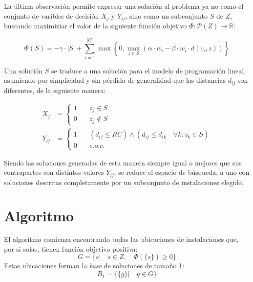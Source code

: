 La última observación permite expresar una solución al problema ya no como el conjunto de varibles de decisión $X_{j}$ y $Y_{ij}$, sino como un subconjunto $S$ de $Z$, buscando maximiziar el valor de la siguiente función objetivo $\Phi : \mathcal{P}(Z) \rightarrow \mathbb{R}$:

\begin{equation}
\Phi(S) = -\gamma \cdot |S| + \sum_{i=1}^{|C|} \max \left\{ 0 , \max_{z \in S} ( \alpha \cdot w_i - \beta \cdot w_i \cdot d(c_i,z)) \right\}
\end{equation}

Una solución $S$ se traduce a una solución para el modelo de programación lineal, asumiendo por simplicidad y sin pérdida de generalidad que las distancias $d_{ij}$ son diferentes, de la siguiente manera:

\begin{align*}
    X_{j} &= \begin{cases}
        1 &\quad z_j \in S \\
        0 &\quad z_j \notin S
    \end{cases}\\
    Y_{ij} &= \begin{cases}
        1 &\quad (d_{ij} \leq RC) \wedge (d_{ij} \leq d_{ik} \quad \forall k : z_k \in S)
        \\
        0 &\quad e.o.c.
    \end{cases}
\end{align*}

Siendo las soluciones generadas de esta manera siempre igual o mejores que sus contrapartes con distintos valores $Y_{ij}$, se reduce el espacio de búsqueda, a uno con soluciones descritas completamente por un subconjunto de instalaciones elegido.


\section{Algoritmo}

El algoritmo comienza encontrando todas las ubicaciones de instalaciones que, por si solas, tienen función objetivo positiva:
\begin{equation}
G = \{ s |  \quad s \in Z, \quad \Phi(\{s\}) \geq 0 \}
\end{equation}
Estas ubicaciones forman la \emph{base} de soluciones de tamaño 1:
\begin{equation}
B_1 = \{ \{g\} | \quad g \in G \}
\end{equation}

